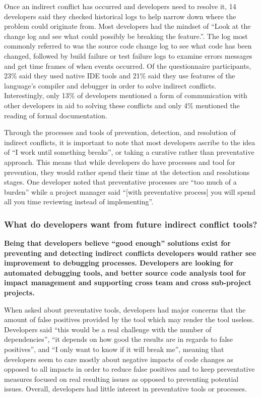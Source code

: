 Once an indirect conflict has occurred and developers need to resolve it, 14 developers said
they checked historical logs to help narrow down where the problem could originate from. Most developers had the mindset of
``Look at the change log and see what could possibly be breaking the feature.''. The log most commonly referred to was the source
code change log to see what code has been changed, followed by build failure or test failure logs to examine errors messages and get time
frames of when events occurred. Of the questionnaire participants, 23\% said they used native IDE tools and 21\% said they use
features of the language's compiler and debugger in order to solve indirect conflicts. Interestingly, only 13\% of developers
mentioned a form of communication with other developers in aid to solving these conflicts and only 4\% mentioned the reading
of formal documentation.

Through the processes and tools of prevention, detection, and resolution of indirect conflicts, it is important to note that
most developers ascribe to the idea of ``I work until something breaks'', or taking a curative rather than preventative
approach. This means that while developers do have processes and tool for prevention, they would rather spend their time
at the detection and resolutions stages. One developer noted that preventative processes are ``too much of a burden''
while a project manager said ``[with preventative process] you will spend all you time reviewing instead of implementing''.

\subsubsection{What do developers want from future indirect conflict tools?}

\bf{Being that developers believe ``good enough'' solutions exist for preventing and detecting indirect conflicts
developers would rather see improvement to debugging processes. Developers are looking for automated debugging tools,
and better source code analysis tool for impact management and supporting cross team and cross sub-project projects.}

\normalfont{}

When asked about preventative tools, developers had major concerns that the amount of false positives
provided by the tool which may render the tool useless. Developers said ``this would
be a real challenge with the number of dependencies'', ``it depends on how
good the results are in regards to false positives'', and ``I only want to know if it will break me'', meaning that
developers seem to care mostly about negative impacts of code changes as opposed to all impacts in order to reduce
false positives and to keep preventative measures focused on real resulting issues as opposed to preventing potential
issues. Overall, developers had little interest in preventative tools or processes.

